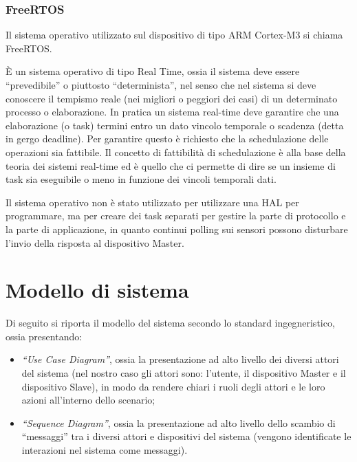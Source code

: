 \documentclass[a4paper,titlepage]{book}
\begin{document}
\subsection{FreeRTOS}

Il sistema operativo utilizzato sul dispositivo di tipo ARM Cortex-M3 si chiama FreeRTOS. 

È un sistema operativo di tipo Real Time, ossia  il sistema deve essere ``prevedibile'' o piuttosto ``determinista'', nel senso che nel sistema si deve conoscere il tempismo reale (nei migliori o peggiori dei casi) di un determinato processo o elaborazione. In pratica un sistema real-time deve garantire che una elaborazione (o task) termini entro un dato vincolo temporale o scadenza (detta in gergo deadline). Per garantire questo è richiesto che la schedulazione delle operazioni sia fattibile. Il concetto di fattibilità di schedulazione è alla base della teoria dei sistemi real-time ed è quello che ci permette di dire se un insieme di task sia eseguibile o meno in funzione dei vincoli temporali dati.

Il sistema operativo non è stato utilizzato per utilizzare una HAL per programmare, ma per creare dei task separati per gestire la parte di protocollo e la parte di applicazione, in quanto continui polling sui sensori possono disturbare l'invio della risposta al dispositivo Master.




\chapter{Modello di sistema}

Di seguito si riporta il modello del sistema secondo lo standard ingegneristico, ossia presentando:
\begin{itemize}[noitemsep,topsep=23pt,parsep=23pt,partopsep=0pt]

\item\textit{``Use Case Diagram''}, ossia la presentazione ad alto livello dei diversi attori del sistema (nel nostro caso gli attori sono: l'utente, il dispositivo Master e il dispositivo Slave), in modo da rendere chiari i ruoli degli attori e le loro azioni all'interno dello scenario;
\item\textit{``Sequence Diagram''}, ossia la presentazione ad alto livello dello scambio di ``messaggi'' tra i diversi attori e dispositivi del sistema (vengono identificate le interazioni nel sistema come messaggi).

\end{itemize}
\end{document}
